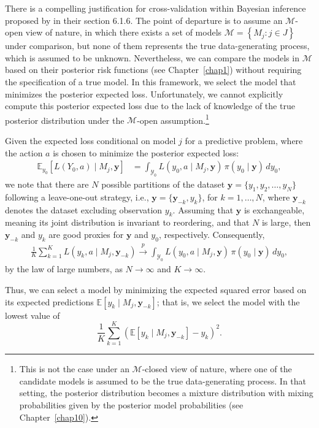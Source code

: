 There is a compelling justification for cross-validation within Bayesian inference proposed by \cite{Bernardo1994} in their section 6.1.6. The point of departure is to assume an $\mathcal{M}$-open view of nature, in which there exists a set of models $\mathcal{M} = \left\{M_j : j \in J\right\}$ under comparison, but none of them represents the true data-generating process, which is assumed to be unknown. Nevertheless, we can compare the models in $\mathcal{M}$ based on their posterior risk functions (see Chapter~\ref{chap1}) without requiring the specification of a true model. In this framework, we select the model that minimizes the posterior expected loss. Unfortunately, we cannot explicitly compute this posterior expected loss due to the lack of knowledge of the true posterior distribution under the $\mathcal{M}$-open assumption.\footnote{This is not the case under an $\mathcal{M}$-closed view of nature, where one of the candidate models is assumed to be the true data-generating process. In that setting, the posterior distribution becomes a mixture distribution with mixing probabilities given by the posterior model probabilities (see Chapter~\ref{chap10}).}

Given the expected loss conditional on model \( j \) for a predictive problem, where the action \( a \) is chosen to minimize the posterior expected loss:
\begin{align*}
	\mathbb{E}_{y_0}[L(Y_0,a) \mid M_j, \mathbf{y}] &= \int_{\mathcal{Y}_0} L(y_0, a \mid M_j, \mathbf{y}) \, \pi(y_0 \mid \mathbf{y}) \, dy_0,
\end{align*}
we note that there are \( N \) possible partitions of the dataset \( \mathbf{y} = \{y_1, y_2, \dots, y_N\} \) following a leave-one-out strategy, i.e., \( \mathbf{y} = \{\mathbf{y}_{-k}, y_k\} \), for \( k = 1, \dots, N \), where \( \mathbf{y}_{-k} \) denotes the dataset excluding observation \( y_k \). Assuming that \( \mathbf{y} \) is exchangeable, meaning its joint distribution is invariant to reordering, and that \( N \) is large, then \( \mathbf{y}_{-k} \) and \( y_k \) are good proxies for \( \mathbf{y} \) and \( y_0 \), respectively. Consequently,
\begin{align*}
	\frac{1}{K} \sum_{k=1}^K L(y_k, a \mid M_j, \mathbf{y}_{-k}) 
	\stackrel{p}{\rightarrow}\int_{\mathcal{Y}_0} L(y_0, a \mid M_j, \mathbf{y}) \, \pi(y_0 \mid \mathbf{y}) \, dy_0,
\end{align*}
by the law of large numbers, as \( N \to \infty \) and \( K \to \infty \).

Thus, we can select a model by minimizing the expected squared error based on its expected predictions \( \mathbb{E}[y_k \mid M_j, \mathbf{y}_{-k}] \); that is, we select the model with the lowest value of
\[
\frac{1}{K} \sum_{k=1}^K \left( \mathbb{E}[y_k \mid M_j, \mathbf{y}_{-k}] - y_k \right)^2.
\]

